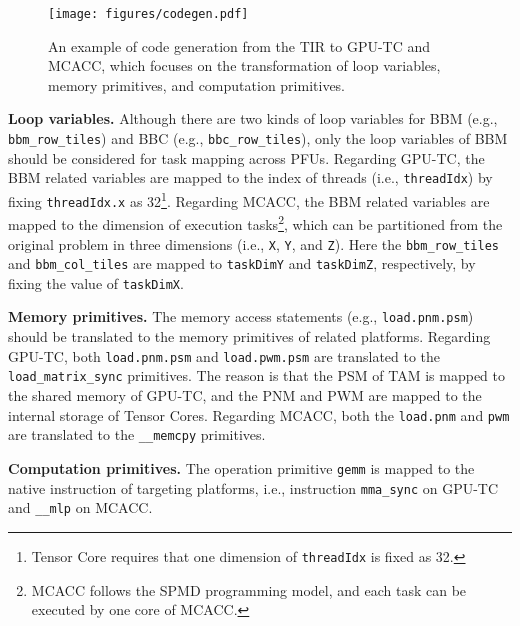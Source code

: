 \begin{figure}
  \begin{center}
\texttt{[image: figures/codegen.pdf]}
\end{center}
\vspace{-15pt}
\caption{\footnotesize An example of code generation from the TIR to GPU-TC and MCACC, which focuses on the transformation of loop variables, memory primitives, and computation primitives.}
\label{fig:codegen}
\vspace{-20pt}
\end{figure}

\textbf{Loop variables.} Although there are two kinds of loop variables for BBM (e.g., \texttt{bbm\_row\_tiles}) and BBC (e.g., \texttt{bbc\_row\_tiles}), only the loop variables of BBM should be considered for task mapping across PFUs. Regarding GPU-TC, the BBM related variables are mapped to the index of threads (i.e., \texttt{threadIdx}) by fixing \texttt{threadIdx.x} as 32\footnote{Tensor Core requires that one dimension of \texttt{threadIdx} is fixed as 32.}. Regarding MCACC, the BBM related variables are mapped to the dimension of execution tasks\footnote{MCACC follows the SPMD programming model, and each task can be executed by one core of MCACC.}, which can be partitioned from the original problem in three dimensions (i.e., \texttt{X}, \texttt{Y}, and \texttt{Z}). Here the \texttt{bbm\_row\_tiles} and \texttt{bbm\_col\_tiles} are mapped to \texttt{taskDimY} and \texttt{taskDimZ}, respectively, by fixing the value of \texttt{taskDimX}.


\textbf{Memory primitives.} The memory access statements (e.g., \texttt{load.pnm.psm}) should be translated to the memory primitives of related platforms. Regarding GPU-TC, both \texttt{load.pnm.psm} and \texttt{load.pwm.psm} are translated to the \texttt{load\_matrix\_sync} primitives. The reason is that the PSM of TAM is mapped to the shared memory of GPU-TC, and the PNM and PWM are mapped to the internal storage of Tensor Cores. Regarding MCACC, both the \texttt{load.pnm} and \texttt{pwm} are translated to the \texttt{\_\_memcpy} primitives.

\textbf{Computation primitives.} The operation primitive \texttt{gemm} is mapped to the native instruction of targeting platforms, i.e., instruction \texttt{mma\_sync} on GPU-TC and \texttt{\_\_mlp} on MCACC.



